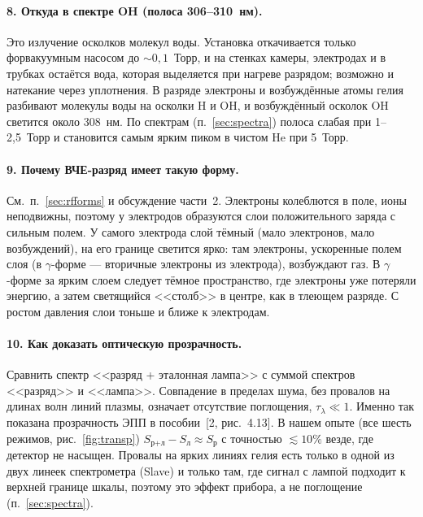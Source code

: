 \documentclass[12pt,a4paper]{article}
\begin{document}
\paragraph{8. Откуда в спектре OH (полоса 306--310~нм).}
Это излучение осколков молекул воды. Установка откачивается только
форвакуумным насосом до $\sim 0{,}1$~Торр, и на стенках камеры,
электродах и в трубках остаётся вода, которая выделяется при нагреве
разрядом; возможно и натекание через уплотнения. В разряде электроны
и возбуждённые атомы гелия разбивают молекулы воды на осколки H и OH, и
возбуждённый осколок OH светится около 308~нм. По спектрам
(п.~\ref{sec:spectra}) полоса слабая при 1--2,5~Торр и становится
самым ярким пиком в чистом He при 5~Торр.

\paragraph{9. Почему ВЧЕ-разряд имеет такую форму.}
См.~п.~\ref{sec:rfforms} и обсуждение части~2. Электроны колеблются в поле,
ионы неподвижны, поэтому у электродов образуются слои положительного
заряда с сильным полем. У самого электрода слой тёмный (мало электронов,
мало возбуждений), на его границе светится ярко: там электроны,
ускоренные полем слоя (в $\gamma$-форме --- вторичные электроны из
электрода), возбуждают газ. В $\gamma$-форме за ярким слоем следует
тёмное пространство, где электроны уже потеряли энергию, а затем
светящийся <<столб>> в центре, как в тлеющем разряде. С ростом давления
слои тоньше и ближе к электродам.

\paragraph{10. Как доказать оптическую прозрачность.}
Сравнить спектр <<разряд + эталонная лампа>> с суммой спектров
<<разряд>> и <<лампа>>. Совпадение в пределах шума, без провалов на
длинах волн линий плазмы, означает отсутствие поглощения, $\tau_\lambda\ll1$.
Именно так показана прозрачность ЭПП в пособии~[2, рис.~4.13].
В нашем опыте (все шесть режимов, рис.~\ref{fig:transp})
$S_\text{р+л}-S_\text{л}\approx S_\text{р}$ с точностью $\lesssim 10\%$
везде, где детектор не насыщен. Провалы на ярких линиях гелия есть
только в одной из двух линеек спектрометра (Slave) и только там, где
сигнал с лампой подходит к верхней границе шкалы, поэтому это эффект
прибора, а не поглощение (п.~\ref{sec:spectra}).
\end{document}
